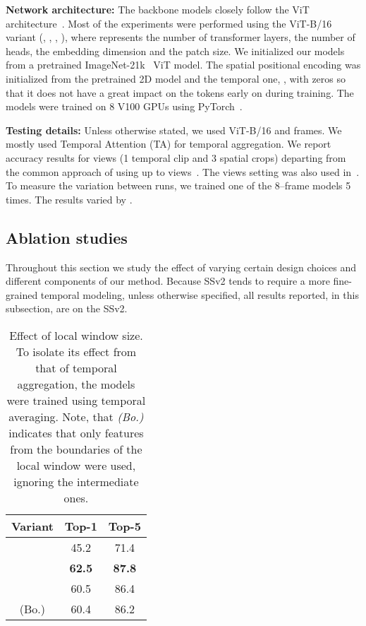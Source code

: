 \documentclass{article}
\begin{document}
\noindent \textbf{Network architecture:} The backbone models closely follow the ViT architecture~\citep{dosovitskiy2020image}. Most of the experiments were performed using the ViT-B/16 variant (, , , ), where  represents the number of transformer layers,  the number of heads,  the embedding dimension and  the patch size. We initialized our models from a pretrained ImageNet-21k~\citep{deng2009imagenet} ViT model. The spatial positional encoding  was initialized from the pretrained 2D model and the temporal one, , with zeros so that it does not have a great impact on the tokens early on during training. The models were trained on 8 V100 GPUs using PyTorch~\citep{paszke2019pytorch}.



\textbf{Testing details:} Unless otherwise stated, we used ViT-B/16 and  frames. We mostly used Temporal Attention (TA) for temporal aggregation. We report accuracy results for  views (1 temporal clip and 3 spatial crops) departing from the common approach of using up to  views~\citep{lin2019tsm,feichtenhofer2019slowfast}. The  views setting was also used in~\citet{bertasius2021space}. To measure the variation between runs, we trained one of the 8--frame models 5 times. The results varied by . 

\subsection{Ablation studies}\label{ssec:results-ablation}

Throughout this section we study the effect of varying certain design choices and different components of our method. Because SSv2 tends to require a more fine-grained temporal modeling, unless otherwise specified, all results reported, in this subsection, are on the SSv2. 

\begin{wraptable}[14]{r}{5.5cm}
\vspace{-0.4cm}
    \caption{Effect of local window size. To isolate its effect from that of temporal aggregation, the models were trained using temporal averaging. Note, that \textit{(Bo.)} indicates that only features from the boundaries of the local window were used, ignoring the intermediate ones. }\label{tab:local-window-size}
    
    \centering
    \begin{tabular}{ccc}
        \toprule
      Variant & Top-1 & Top-5  \\
       \midrule
         & 45.2 & 71.4  \\
         & \textbf{62.5} & \textbf{87.8}  \\
         & 60.5 & 86.4  \\
         (Bo.) & 60.4 & 86.2  \\
        \bottomrule
    \end{tabular}
\end{wraptable}
\end{document}

